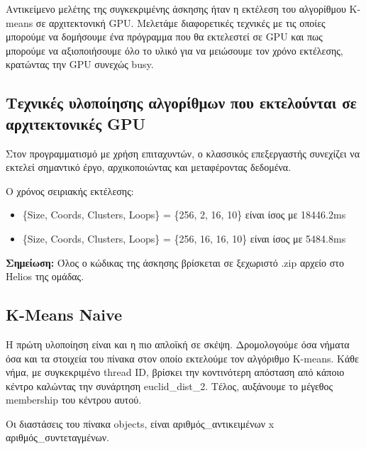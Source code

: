\documentclass[../final_report.tex]{subfiles}
\begin{document}
Αντικείμενο μελέτης της συγκεκριμένης άσκησης ήταν η εκτέλεση του αλγορίθμου K-means σε αρχιτεκτονική GPU.
Μελετάμε διαφορετικές τεχνικές με τις οποίες μπορούμε να δομήσουμε ένα πρόγραμμα που θα εκτελεστεί σε GPU και πως
μπορούμε να αξιοποιήσουμε όλο το υλικό για να μειώσουμε τον χρόνο εκτέλεσης, κρατώντας την GPU συνεχώς busy.



\subsection{Τεχνικές υλοποίησης αλγορίθμων που εκτελούνται σε αρχιτεκτονικές GPU}

Στον προγραμματισμό με χρήση επιταχυντών, ο κλασσικός επεξεργαστής συνεχίζει να εκτελεί σημαντικό έργο, αρχικοποιώντας
και μεταφέροντας δεδομένα.

Ο χρόνος σειριακής εκτέλεσης:

\begin{itemize}
    \item \{Size, Coords, Clusters, Loops\} = \{256, 2, 16, 10\} είναι ίσος με 18446.2ms
    \item \{Size, Coords, Clusters, Loops\} = \{256, 16, 16, 10\} είναι ίσος με 5484.8ms
\end{itemize}

\textbf{Σημείωση:} Όλος ο κώδικας της άσκησης βρίσκεται σε ξεχωριστό .zip αρχείο στο Helios της ομάδας.


\subsection{K-Means Naive}
Η πρώτη υλοποίηση είναι και η πιο απλοϊκή σε σκέψη. Δρομολογούμε όσα νήματα όσα και τα στοιχεία του πίνακα στον οποίο εκτελούμε
τον αλγόριθμο K-means. Κάθε νήμα, με συγκεκριμένο thread ID, βρίσκει την κοντινότερη απόσταση από κάποιο κέντρο καλώντας την συνάρτηση euclid\_dist\_2.
Τέλος, αυξάνουμε το μέγεθος membership του κέντρου αυτού.

Οι διαστάσεις του πίνακα objects, είναι αριθμός\_αντικειμένων x αριθμός\_συντεταγμένων. 
\end{document}
